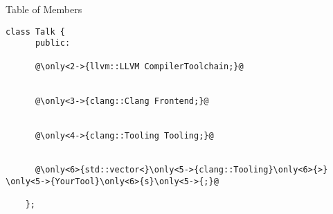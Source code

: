 

\begin{frame}[fragile]{Table of Members}
  \begin{lstlisting}[basicstyle=\ttfamily\small]
    class Talk {
      public:

      @\only<2->{llvm::LLVM CompilerToolchain;}@


      @\only<3->{clang::Clang Frontend;}@


      @\only<4->{clang::Tooling Tooling;}@


      @\only<6>{std::vector<}\only<5->{clang::Tooling}\only<6>{>} \only<5->{YourTool}\only<6>{s}\only<5->{;}@

    };
  \end{lstlisting}
\end{frame}
